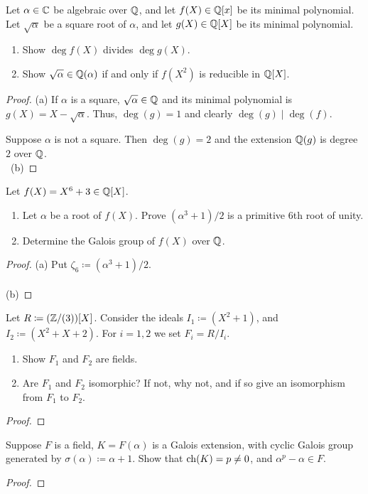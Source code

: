 \begin{problem}
Let $\alpha\in\mathbb{C}$ be algebraic over $\mathbb{Q}$, and let $f(X)\in\mathbb{Q}[x]$ be
its minimal polynomial. Let $\sqrt{\alpha}$ be a square root of $\alpha$,
and let $g(X)\in\mathbb{Q}[X]$ be its minimal polynomial.
\begin{enumerate}[label=(\alph*)]
\item Show $\deg f(X)$ divides $\deg g(X)$.
\item Show $\sqrt{\alpha}\in\mathbb{Q}(\alpha)$ if and only if $f(X^2)$ is
  reducible in $\mathbb{Q}[X]$.
\end{enumerate}
\end{problem}
\begin{proof}
(a) If $\alpha$ is a square, $\sqrt{\alpha}\in\mathbb{Q}$ and its minimal
polynomial is $g(X)=X-\sqrt{\alpha}$. Thus, $\deg(g)=1$ and clearly
$\deg(g)\mid\deg(f)$.

Suppose $\alpha$ is not a square. Then $\deg(g)=2$ and the extension
$\mathbb{Q}(g)$ is degree $2$ over $\mathbb{Q}$.
\\\
(b)
\end{proof}

\begin{problem}
Let $f(X)=X^6+3\in\mathbb{Q}[X]$.
\begin{enumerate}[label=(\alph*)]
\item Let $\alpha$ be a root of $f(X)$. Prove $(\alpha^3+1)/2$ is a
  primitive 6th root of unity.
\item Determine the Galois group of $f(X)$ over $\mathbb{Q}$.
\end{enumerate}
\end{problem}
\begin{proof}
(a) Put $\zeta_6\coloneqq(\alpha^3+1)/2$.
\\\\
(b)
\end{proof}

\begin{problem}
Let $R\coloneqq(\mathbb{Z}/(3))[X]$. Consider the ideals $I_1\coloneqq(X^2+1)$,
and $I_2\coloneqq(X^2+X+2)$. For $i=1,2$ we set $F_i=R/I_i$.
\begin{enumerate}[label=(\alph*)]
\item Show $F_1$ and $F_2$ are fields.
\item Are $F_1$ and $F_2$ isomorphic? If not, why not, and if so give an
  isomorphism from $F_1$ to $F_2$.
\end{enumerate}
\end{problem}
\begin{proof}
\end{proof}

\begin{problem}
Suppose $F$ is a field, $K=F(\alpha)$ is a Galois extension, with cyclic
Galois group generated by $\sigma(\alpha)\coloneqq\alpha+1$. Show that
$\operatorname{ch}(K)=p\neq 0$, and $\alpha^p-\alpha\in F$.
\end{problem}
\begin{proof}
\end{proof}

